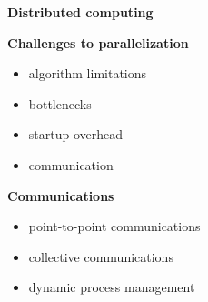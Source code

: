\begin{frame}\begin{center}
		\LARGE\textbf{Distributed computing}
\end{center}\end{frame}
\begin{frame}\textbf{Challenges to parallelization}\vspace{0.3cm}

\begin{itemize}\setlength\itemsep{1em}
  \item algorithm limitations
  \item bottlenecks
  \item startup overhead
	\item communication
\end{itemize}

\end{frame}
\begin{frame}\textbf{Communications}\vspace{0.3cm}

\begin{itemize}\setlength\itemsep{1em}
  \item point-to-point communications
  \item collective communications
  \item dynamic process management
\end{itemize}

\end{frame}
